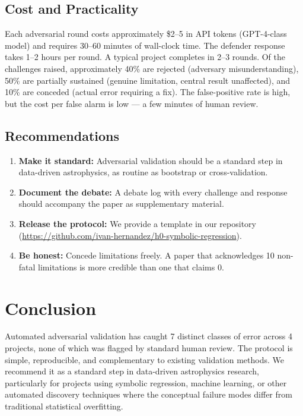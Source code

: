 \documentclass[twocolumn]{aastex631}
\begin{document}
\subsection{Cost and Practicality}

Each adversarial round costs approximately \$2--5 in API tokens
(GPT-4-class model) and requires 30--60 minutes of wall-clock time.
The defender response takes 1--2 hours per round.  A typical project
completes in 2--3 rounds.  Of the challenges raised, approximately
40\% are rejected (adversary misunderstanding), 50\% are partially
sustained (genuine limitation, central result unaffected), and 10\%
are conceded (actual error requiring a fix).  The false-positive rate
is high, but the cost per false alarm is low --- a few minutes of
human review.

\subsection{Recommendations}

\begin{enumerate}
  \item \textbf{Make it standard:} Adversarial validation should be a
        standard step in data-driven astrophysics, as routine as
        bootstrap or cross-validation.
  \item \textbf{Document the debate:} A debate log with every challenge
        and response should accompany the paper as supplementary material.
  \item \textbf{Release the protocol:} We provide a template in our
        repository (\url{https://github.com/ivan-hernandez/h0-symbolic-regression}).
  \item \textbf{Be honest:} Concede limitations freely.  A paper that
        acknowledges 10 non-fatal limitations is more credible than one
        that claims 0.
\end{enumerate}

\section{Conclusion}

Automated adversarial validation has caught 7 distinct classes of error
across 4 projects, none of which was flagged by standard human review.  The
protocol is simple, reproducible, and complementary to existing validation
methods.  We recommend it as a standard step in data-driven astrophysics
research, particularly for projects using symbolic regression, machine
learning, or other automated discovery techniques where the conceptual
failure modes differ from traditional statistical overfitting.
\end{document}
